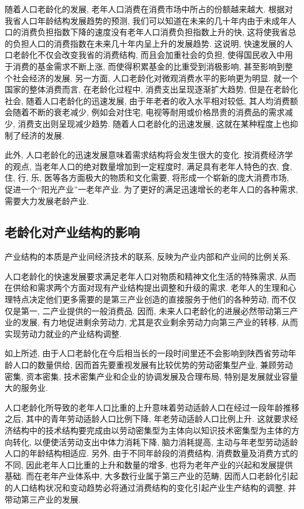 \documentclass[a4paper, 12pt, UTF8]{article}
\begin{document}
随着人口老龄化的发展, 老年人口消费在消费市场中所占的份额越来越大. 根据对我省人口年龄结构发展趋势的预测, 我们可以知道在未来的几十年内由于未成年人口的消费负担指数下降的速度没有老年人口消费负担指数上升的快, 这将使我省总的负担人口的消费指数在未来几十年内呈上升的发展趋势. 这说明, 快速发展的人口老龄化不仅会改变我省的消费结构, 而且会加重社会的负担, 使得国民收入中用于消费的基金需求不断上涨, 而使得积累基金的比重受到消极影响, 甚至影响到整个社会经济的发展. 另一方面, 人口老龄化对微观消费水平的影响更为明显. 就一个国家的整体消费而言, 在老龄化过程中, 消费支出呈现逐渐扩大趋势, 但是在老龄化社会, 随着人口老龄化的迅速发展, 由于年老者的收入水平相对较低, 其人均消费额会随着不断的衰老减少, 例如会对住宅, 电视等耐用或价格昂贵的消费品的需求减少, 消费支出则呈现减少趋势. 随着人口老龄化的迅速发展, 这就在某种程度上也抑制了经济的发展. 

此外, 人口老龄化的迅速发展意味着需求结构将会发生很大的变化. 按消费经济学的观点, 当老年人口的绝对数量增加到一定程度时, 满足具有老年人特色的衣, 食, 住, 行, 乐, 医等各方面极大的物质和文化需要, 将形成一个崭新的庞大消费市场, 促进一个``阳光产业''一老年产业. 为了更好的满足迅速增长的老年人口的各种需求, 需要大力发展老龄产业. 

\subsection{老龄化对产业结构的影响}
产业结构的本质是产业间经济技术的联系, 反映为产业内部和产业间的比例关系. 

人口老龄化的快速发展要求满足老年人口对物质和精神文化生活的特殊需求, 从而在供给和需求两个方面对现有产业结构提出调整和升级的需求. 老年人的生理和心理特点决定他们更多需要的是第三产业创造的直接服务于他们的各种劳动, 而不仅仅是第一,  二产业提供的一般消费品. 因而, 未来人口老龄化的进展必然带动第三产业的发展, 有力地促进剩余劳动力, 尤其是农业剩余劳动力向第三产业的转移, 从而实现劳动力就业的产业结构调整. 

如上所述, 由于人口老龄化在今后相当长的一段时间里还不会影响到陕西省劳动年龄人口的数量供给, 因而首先要重视发展有比较优势的劳动密集型产业, 兼顾劳动密集,  资本密集,  技术密集产业和企业的协调发展及合理布局, 特别是发展就业容量大的服务业. 

人口老龄化所导致的老年人口比重的上升意味着劳动适龄人口在经过一段年龄推移之后, 其中的青年劳动适龄人口比例下降, 年老劳动适龄人口比例上升. 这就要求经济结构中的技术结构要完成由以劳动密集型为主体向以知识技术密集型为主体的方向转化, 以便使活劳动支出中体力消耗下降, 脑力消耗提高, 主动与年老型劳动适龄人口的年龄结构相适应. 另外, 由于不同年龄段的消费结构,  消费数量及消费方式的不同, 因此老年人口比重的上升和数量的增多, 也将为老年产业的兴起和发展提供基础. 而在老年产业体系中, 大多数行业属于第三产业的范畴, 因而人口老龄化引起的人口结构状况和变动趋势必将通过消费结构的变化引起产业生产结构的调整, 并带动第三产业的发展.
\end{document}
